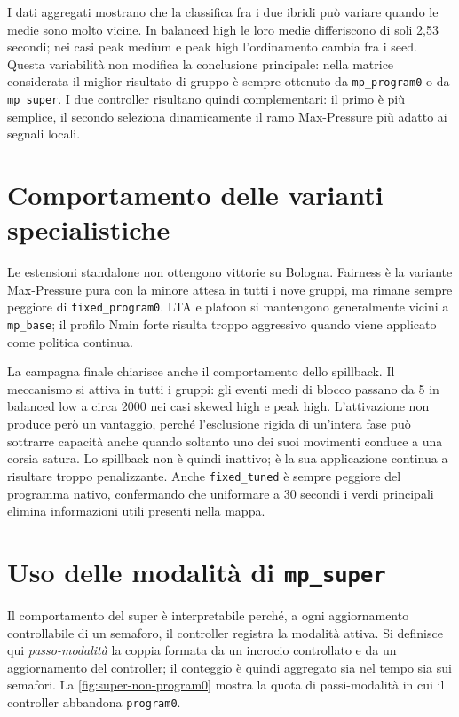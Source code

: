 \documentclass[12pt,a4paper,oneside]{report}
\numberwithin{equation}{chapter}
\begin{document}
I dati aggregati mostrano che la classifica fra i due ibridi può variare quando
le medie sono molto vicine. In balanced high le loro medie differiscono di soli
2,53 secondi; nei casi peak medium e peak high l'ordinamento cambia fra i seed.
Questa variabilità non modifica la conclusione principale: nella matrice
considerata il miglior risultato di gruppo è sempre ottenuto da
\texttt{mp\_program0} o da \texttt{mp\_super}. I due controller risultano quindi
complementari: il primo è più semplice, il secondo seleziona dinamicamente il
ramo Max-Pressure più adatto ai segnali locali.

\section{Comportamento delle varianti specialistiche}

Le estensioni standalone non ottengono vittorie su Bologna. Fairness è la
variante Max-Pressure pura con la minore attesa in tutti i nove gruppi, ma
rimane sempre peggiore di \texttt{fixed\_program0}. LTA e platoon si
mantengono generalmente vicini a \texttt{mp\_base}; il profilo Nmin forte
risulta troppo aggressivo quando viene applicato come politica continua.

La campagna finale chiarisce anche il comportamento dello spillback. Il
meccanismo si attiva in tutti i gruppi: gli eventi medi di blocco passano da 5
in balanced low a circa 2000 nei casi skewed high e peak high. L'attivazione
non produce però un vantaggio, perché l'esclusione rigida di un'intera fase può
sottrarre capacità anche quando soltanto uno dei suoi movimenti conduce a una
corsia satura. Lo spillback non è quindi inattivo; è la sua applicazione
continua a risultare troppo penalizzante. Anche \texttt{fixed\_tuned} è
sempre peggiore del programma nativo, confermando che uniformare a 30 secondi i
verdi principali elimina informazioni utili presenti nella mappa.

\section{Uso delle modalità di \texttt{mp\_super}}

Il comportamento del super è interpretabile perché, a ogni aggiornamento
controllabile di un semaforo, il controller registra la modalità attiva. Si
definisce qui \emph{passo-modalità} la coppia formata da un incrocio controllato
e da un aggiornamento del controller; il conteggio è quindi aggregato sia nel
tempo sia sui semafori. La \cref{fig:super-non-program0} mostra la quota di
passi-modalità in cui il controller abbandona \texttt{program0}.
\end{document}

